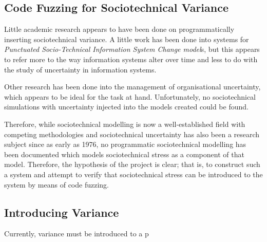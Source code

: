 \subsection{Code Fuzzing for Sociotechnical Variance}
Little academic research appears to have been done on programmatically inserting sociotechnical variance. A little work has been done into systems for \emph{Punctuated Socio-Technical Information System Change model}s\cite{Lyytinen2008}, but this appears to refer more to the way information systems alter over time and less to do with the study of uncertainty in information systems. \par
Other research has been done into the management of organisational uncertainty\cite{Grote2004}\cite{Herrmann1999}, which appears to be ideal for the task at hand. Unfortunately, no sociotechnical simulations with uncertainty injected into the models created could be found. \par
Therefore, while sociotechnical modelling is now a well-established field with competing methodologies and sociotechnical uncertainty has also been a research subject since as early as 1976\cite{Susman1976}, no programmatic sociotechnical modelling has been documented which models sociotechnical stress as a component of that model. Therefore, the hypothesis of the project is clear; that is, to construct such a system and attempt to verify that sociotechnical stress can be introduced to the system by means of code fuzzing. \par


\subsection{Introducing Variance}
\label{Variance_research}
Currently, variance must be introduced to a p

